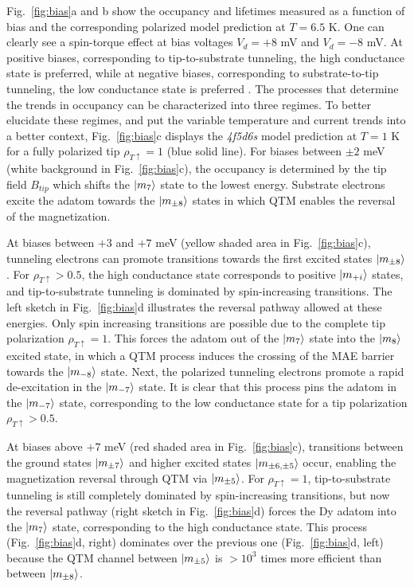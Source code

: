 \documentclass[
reprint,amsmath,amssymb,aps]{revtex4-2}
\begin{document}
Fig.~\ref{fig:bias}a and b show the occupancy and lifetimes measured as a function of bias and the corresponding polarized model prediction at $T=6.5$ K. One can clearly see a spin-torque effect at bias voltages $V_d=+8 $ mV and $V_d=-8 $ mV. At  positive biases, corresponding to tip-to-substrate tunneling, the high conductance state is preferred, while at negative biases, corresponding to substrate-to-tip tunneling, the low conductance state is preferred \cite{Khajetoorians2013,delgadoSpinTransferTorqueSingle2010,balashovInelasticElectronmagnonInteraction2008,krause_joule_2011}. The processes that determine the trends in occupancy can be characterized into three regimes. To better elucidate these regimes, and put the variable temperature and current trends into a better context, Fig.~\ref{fig:bias}c displays the \textit{4f5d6s} model prediction at $T=1$ K for a fully polarized tip $\rho_{T \uparrow} = 1 $ (blue solid line). For biases between $\pm 2$ meV (white background in Fig.~\ref{fig:bias}c), the occupancy is determined by the tip field $B_{tip}$ which shifts the $\ket{m_{7}}$ state to the lowest energy. Substrate electrons excite the adatom towards the $\ket{m_{\pm8}}$ states in which QTM enables the reversal of the magnetization.

At biases between $+3$ and $+7$ meV (yellow shaded area in Fig.~\ref{fig:bias}c), tunneling electrons can promote transitions towards the first excited states $\ket{m_{\pm 8}}$. For $\rho_{T \uparrow} > 0.5 $, the high conductance state corresponds to positive $\ket{m_{+i}}$ states, and tip-to-substrate tunneling is dominated by spin-increasing transitions. The left sketch in Fig.~\ref{fig:bias}d illustrates the reversal pathway allowed at these energies. Only spin increasing transitions are possible due to the complete tip polarization $\rho_{T \uparrow} = 1$. This forces the adatom out of the $\ket{m_{7}}$ state into the $\ket{m_{8}}$ excited state, in which a QTM process induces the crossing of the MAE barrier towards the $\ket{m_{-8}}$ state. Next, the polarized tunneling electrons promote a rapid de-excitation in the $\ket{m_{-7}}$ state. It is clear that this process pins the adatom in the $\ket{m_{-7}}$ state, corresponding to the low conductance state for a tip polarization $\rho_{T \uparrow} > 0.5 $. 

At biases above $+7$ meV (red shaded area in Fig.~\ref{fig:bias}c), transitions between the ground states $\ket{m_{\pm7}}$ and higher excited states $\ket{m_{\pm 6, \pm 5}}$ occur, enabling the magnetization reversal through QTM via $\ket{m_{\pm 5}}$. For $\rho_{T \uparrow} = 1 $, tip-to-substrate tunneling is still completely dominated by spin-increasing transitions, but now the reversal pathway (right sketch in Fig.~\ref{fig:bias}d) forces the Dy adatom into the $\ket{m_{7}}$ state, corresponding to the high conductance state. This process (Fig.~\ref{fig:bias}d, right) dominates over the previous one (Fig.~\ref{fig:bias}d, left) because the QTM channel between $\ket{m_{\pm 5}}$ is $>10^3$ times more efficient than between $\ket{m_{\pm 8}}$. 
\end{document}
